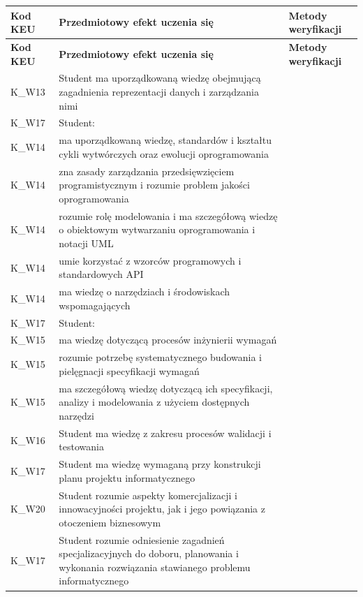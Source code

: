 \documentclass[12pt, a4paper]{article}
\newcommand{\thdrule}{\noalign{\global\setlength{\extrarowheight}{0pt}}}
\newcommand{\thdend}{\noalign{\global\setlength{\extrarowheight}{3pt}}}
\begin{document}
{\scriptsize
\begin{longtable}{m{1.6cm}m{9.0cm}m{4.2cm}}
\thdrule\toprule
\rowcolor{pjatkRed} {\color{white}\footnotesize\textbf{\vphantom{Ag}Kod KEU}} & {\color{white}\footnotesize\textbf{\vphantom{Ag}Przedmiotowy efekt uczenia się}} & {\color{white}\footnotesize\textbf{\vphantom{Ag}Metody weryfikacji}} \\
\midrule\thdend
\endfirsthead
\thdrule\toprule
\rowcolor{pjatkRed} {\color{white}\footnotesize\textbf{\vphantom{Ag}Kod KEU}} & {\color{white}\footnotesize\textbf{\vphantom{Ag}Przedmiotowy efekt uczenia się}} & {\color{white}\footnotesize\textbf{\vphantom{Ag}Metody weryfikacji}} \\
\midrule\thdend
\endhead
  \rowcolor{tableRowLight} K\_W13 & Student ma uporządkowaną wiedzę obejmującą zagadnienia reprezentacji danych i zarządzania nimi &  \\
  \rowcolor{tableRowAlt} K\_W17 & Student: &  \\
  \rowcolor{tableRowLight} K\_W14 & ma uporządkowaną wiedzę, standardów i kształtu cykli wytwórczych oraz ewolucji oprogramowania &  \\
  \rowcolor{tableRowAlt} K\_W14 & zna zasady zarządzania przedsięwzięciem programistycznym i rozumie problem jakości oprogramowania &  \\
  \rowcolor{tableRowLight} K\_W14 & rozumie rolę modelowania i ma szczegółową wiedzę o obiektowym wytwarzaniu oprogramowania i notacji UML &  \\
  \rowcolor{tableRowAlt} K\_W14 & umie korzystać z wzorców programowych i standardowych API &  \\
  \rowcolor{tableRowLight} K\_W14 & ma wiedzę o narzędziach i środowiskach wspomagających &  \\
  \rowcolor{tableRowAlt} K\_W17 & Student: &  \\
  \rowcolor{tableRowLight} K\_W15 & ma wiedzę dotyczącą procesów inżynierii wymagań &  \\
  \rowcolor{tableRowAlt} K\_W15 & rozumie potrzebę systematycznego budowania i pielęgnacji specyfikacji wymagań &  \\
  \rowcolor{tableRowLight} K\_W15 & ma szczegółową wiedzę dotyczącą ich specyfikacji, analizy i modelowania z użyciem dostępnych narzędzi &  \\
  \rowcolor{tableRowAlt} K\_W16 & Student ma wiedzę z zakresu procesów walidacji i testowania &  \\
  \rowcolor{tableRowLight} K\_W17 & Student ma wiedzę wymaganą przy konstrukcji planu projektu informatycznego &  \\
  \rowcolor{tableRowAlt} K\_W20 & Student rozumie aspekty komercjalizacji i innowacyjności projektu, jak i jego powiązania z otoczeniem biznesowym &  \\
  \rowcolor{tableRowLight} K\_W17 & Student rozumie odniesienie zagadnień specjalizacyjnych do doboru, planowania i wykonania rozwiązania stawianego problemu informatycznego &  \\
\bottomrule
\end{longtable}}
\end{document}
